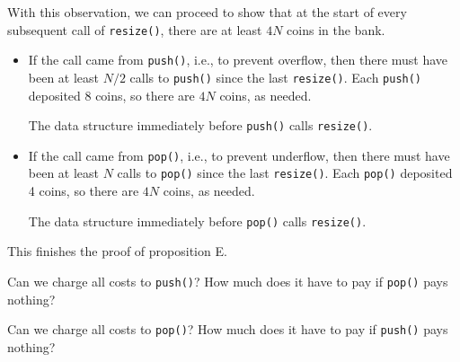 \documentclass{tufte-handout}
\begin{document}
With this observation, we can proceed to show that at the start of
every subsequent call of {\tt resize()}, there are at least $4N$ coins
in the bank.
\begin{itemize}
\item If the call came from \texttt{push()}, i.e., to prevent
  overflow, then there must have been at least $N/2$ calls to
  \texttt{push()} since the last \texttt{resize()}. Each
  \texttt{push()} deposited 8 coins, so there are $4N$ coins, as
  needed.
\begin{marginfigure}
  \caption{The data structure immediately before \texttt{push()} calls
    \texttt{resize()}.}
\end{marginfigure}
\item If the call came from \texttt{pop()}, i.e., to prevent underflow,
  then there must have been at least $N$ calls to \texttt{pop()} since
  the last \texttt{resize()}. Each \texttt{pop()} deposited 4 coins,
  so there are $4N$ coins, as needed.
\begin{marginfigure}
  \caption{The data structure immediately before \texttt{pop()} calls {\tt resize()}.}
\end{marginfigure}
\end{itemize}
This finishes the proof of proposition E.

\begin{ExerciseList}\Exercise Can we charge all costs to
  \texttt{push()}? How much does it have to pay if \texttt{pop()} pays nothing?
\end{ExerciseList}

\begin{ExerciseList} \Exercise Can we charge all costs to
  \texttt{pop()}? How much does it have to pay if \texttt{push()} pays nothing?
\end{ExerciseList}
\end{document}
